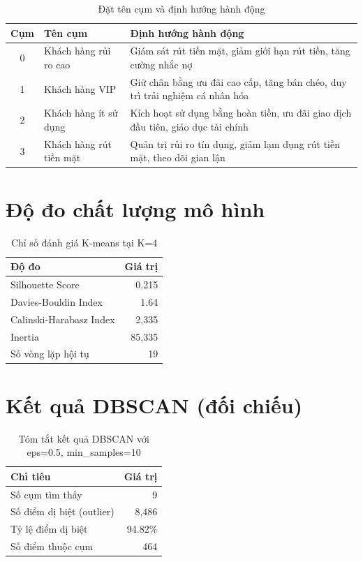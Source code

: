 \begin{table}[H]
\centering
\caption{Đặt tên cụm và định hướng hành động}
\begin{tabular}{|c|p{4cm}|p{7cm}|}
\hline
\textbf{Cụm} & \textbf{Tên cụm} & \textbf{Định hướng hành động} \\
\hline
0 & Khách hàng rủi ro cao & Giám sát rút tiền mặt, giảm giới hạn rút tiền, tăng cường nhắc nợ \\
\hline
1 & Khách hàng VIP & Giữ chân bằng ưu đãi cao cấp, tăng bán chéo, duy trì trải nghiệm cá nhân hóa \\
\hline
2 & Khách hàng ít sử dụng & Kích hoạt sử dụng bằng hoàn tiền, ưu đãi giao dịch đầu tiên, giáo dục tài chính \\
\hline
3 & Khách hàng rút tiền mặt & Quản trị rủi ro tín dụng, giảm lạm dụng rút tiền mặt, theo dõi gian lận \\
\hline
\end{tabular}
\end{table}

\section{Độ đo chất lượng mô hình}

\begin{table}[H]
\centering
\caption{Chỉ số đánh giá K-means tại K=4}
\begin{tabular}{|l|r|}
\hline
\textbf{Độ đo} & \textbf{Giá trị} \\
\hline
Silhouette Score & 0.215 \\
\hline
Davies-Bouldin Index & 1.64 \\
\hline
Calinski-Harabasz Index & 2,335 \\
\hline
Inertia & 85,335 \\
\hline
Số vòng lặp hội tụ & 19 \\
\hline
\end{tabular}
\end{table}

\section{Kết quả DBSCAN (đối chiếu)}

\begin{table}[H]
\centering
\caption{Tóm tắt kết quả DBSCAN với eps=0.5, min\_samples=10}
\begin{tabular}{|l|r|}
\hline
\textbf{Chỉ tiêu} & \textbf{Giá trị} \\
\hline
Số cụm tìm thấy & 9 \\
\hline
Số điểm dị biệt (outlier) & 8,486 \\
\hline
Tỷ lệ điểm dị biệt & 94.82\% \\
\hline
Số điểm thuộc cụm & 464 \\
\hline
\end{tabular}
\end{table}

